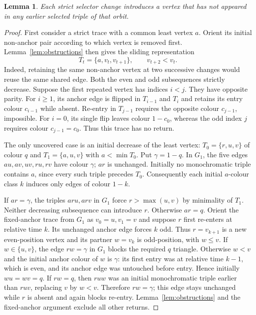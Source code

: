 \documentclass[a4paper,10pt]{amsart}
\newtheorem{lemma}[theorem]{Lemma}
\theoremstyle{remark}
\begin{document}
\begin{lemma}\label{lem:no-return}
Each strict selector change introduces a vertex that has not appeared in
any earlier selected triple of that orbit.
\end{lemma}
\begin{proof}
First consider a strict trace with a common least vertex $a$. Orient its
initial non-anchor pair according to which vertex is removed first.
Lemma~\ref{lem:obstructions} then gives the sliding representation
\[
T_t=\{a,v_t,v_{t+1}\},\qquad v_{t+2}<v_t.
\]
Indeed, retaining the same non-anchor vertex at two successive changes
would reuse the same shared edge. Both the even and odd subsequences
strictly decrease. Suppose the first repeated vertex has indices $i<j$.
They have opposite parity. For $i\ge1$, its anchor edge is flipped in
$T_{i-1}$ and $T_i$ and retains its entry colour $c_{i-1}$ while absent.
Re-entry in $T_{j-1}$ requires the opposite colour $c_{j-1}$, impossible.
For $i=0$, its single flip leaves colour $1-c_0$, whereas the odd index
$j$ requires colour $c_{j-1}=c_0$. Thus this trace has no return.

The only uncovered case is an initial decrease of the least vertex:
$T_0=\{r,u,v\}$ of colour $q$ and $T_1=\{a,u,v\}$ with
$a<\min T_0$. Put $\gamma=1-q$. In $G_1$, the five edges
$au,av,uv,ru,rv$ have colour $\gamma$; $ar$ is unchanged. Initially no
monochromatic triple contains $a$, since every such triple precedes $T_0$.
Consequently each initial $a$-colour class $k$ induces only edges of
colour $1-k$.

If $ar=\gamma$, the triples $aru,arv$ in $G_1$ force
$r>\max(u,v)$ by minimality of $T_1$. Neither decreasing subsequence
can introduce $r$. Otherwise $ar=q$. Orient the fixed-anchor trace from
$G_1$ as $v_0=u,v_1=v$ and suppose $r$ first re-enters at relative time
$k$. Its unchanged anchor edge forces $k$ odd. Thus $r=v_{k+1}$ is a
new even-position vertex and its partner $w=v_k$ is odd-position, with
$w\le v$. If $w\in\{u,v\}$, the edge $rw=\gamma$ in $G_1$ blocks
the required $q$ triangle. Otherwise $w<v$ and the initial anchor colour
of $w$ is $\gamma$: its first entry was at relative time $k-1$, which
is even, and its anchor edge was untouched before entry. Hence initially
$wu=wv=q$. If $rw=q$, then $ruw$ was an initial monochromatic triple
earlier than $ruv$, replacing $v$ by $w<v$. Therefore $rw=\gamma$;
this edge stays unchanged while $r$ is absent and again blocks re-entry.
Lemma~\ref{lem:obstructions} and the fixed-anchor argument exclude all
other returns.
\end{proof}
\end{document}
